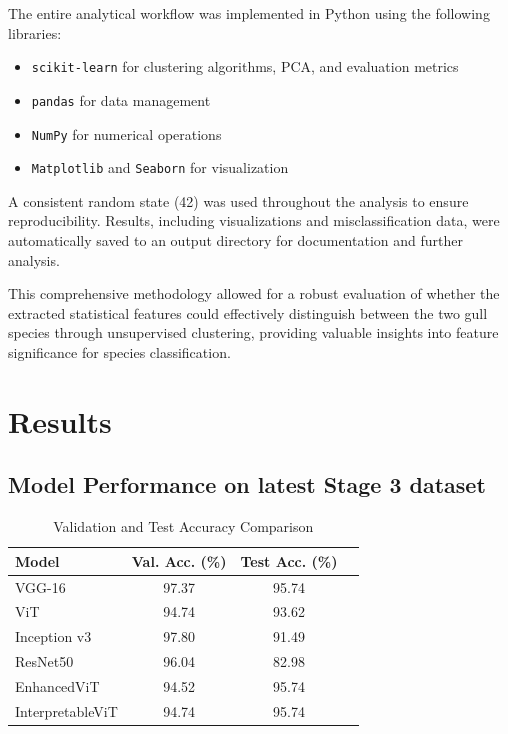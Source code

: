 \documentclass[a4paper,12pt]{report}
\begin{document}
The entire analytical workflow was implemented in Python using the following libraries:

\begin{itemize}
    \item \texttt{scikit-learn} for clustering algorithms, PCA, and evaluation metrics
    \item \texttt{pandas} for data management
    \item \texttt{NumPy} for numerical operations
    \item \texttt{Matplotlib} and \texttt{Seaborn} for visualization
\end{itemize}
A consistent random state (42) was used throughout the analysis to ensure reproducibility. Results, including visualizations and misclassification data, were automatically saved to an output directory for documentation and further analysis.

This comprehensive methodology allowed for a robust evaluation of whether the extracted statistical features could effectively distinguish between the two gull species through unsupervised clustering, providing valuable insights into feature significance for species classification.

\chapter{Results}

\section{Model Performance on latest Stage 3 dataset}

\begin{table}[htbp]
    \centering
    \caption{Validation and Test Accuracy Comparison}
    \label{tab:val_test_comparison}
    \begin{tabular}{lccc}
    \toprule
    \textbf{Model} & \textbf{Val. Acc. (\%)} & \textbf{Test Acc. (\%)} \\
    \midrule
    VGG-16  & 97.37 & 95.74 \\
    ViT & 94.74 & 93.62 \\
    Inception v3 & 97.80 & 91.49  \\
    ResNet50 & 96.04 & 82.98 \\
    EnhancedViT & 94.52 & 95.74  \\
    InterpretableViT & 94.74 & 95.74 \\
    \bottomrule
    \end{tabular}
\end{table}
\end{document}
